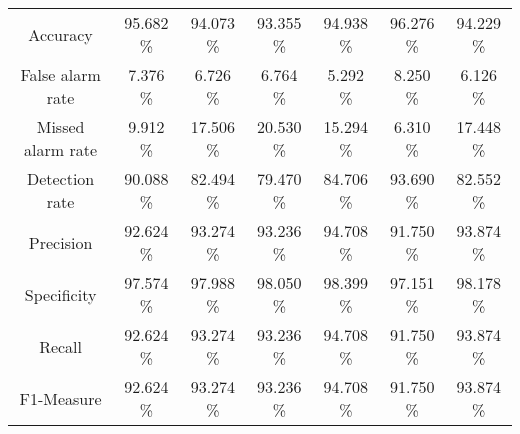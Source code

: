 \begin{table}[htb]
\begin{tabular}{@{}ccccccc@{}}
        Accuracy &  95.682 \% &  94.073 \% &  93.355 \% &  94.938 \% &  96.276 \% &  94.229 \% \\
        False alarm rate &  7.376 \% &  6.726 \% &  6.764 \% &  5.292 \% &  8.250 \% &  6.126 \% \\
        Missed alarm rate &  9.912 \% &  17.506 \% &  20.530 \% &  15.294 \% &  6.310 \% &  17.448 \% \\
        Detection rate &  90.088 \% &  82.494 \% &  79.470 \% &  84.706 \% &  93.690 \% &  82.552 \% \\
        Precision &  92.624 \% &  93.274 \% &  93.236 \% &  94.708 \% &  91.750 \% &  93.874 \% \\
        Specificity &  97.574 \% &  97.988 \% &  98.050 \% &  98.399 \% &  97.151 \% &  98.178 \% \\
        Recall &  92.624 \% &  93.274 \% &  93.236 \% &  94.708 \% &  91.750 \% &  93.874 \% \\
        F1-Measure &  92.624 \% &  93.274 \% &  93.236 \% &  94.708 \% &  91.750 \% &  93.874 \% \\
        \bottomrule
    \end{tabular}
\end{table}